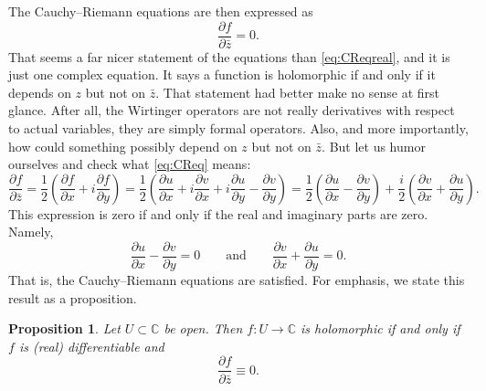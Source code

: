 \documentclass[12pt,openany]{book}
\newcommand{\C}{{\mathbb{C}}}
\theoremstyle{plain}
\newtheorem{prop}[thm]{Proposition}
\theoremstyle{remark}
\theoremstyle{definition}
\theoremstyle{exercise}
\theoremstyle{example}
\begin{document}
The Cauchy--Riemann equations are then expressed as
\begin{equation} \label{eq:CReq}
\frac{\partial f}{\partial \bar{z}} = 0 .
\end{equation}
That seems a far nicer statement of the equations than \eqref{eq:CReqreal},
and it is just one complex equation.  
It says
a function is holomorphic if and only if it depends on $z$ but not on
$\bar{z}$.  That statement had better make no sense at first glance.
After all, the Wirtinger operators are not really derivatives with
respect to actual variables,
they are simply formal operators.
Also, and more importantly,
how could something possibly depend on $z$ but not on $\bar{z}$.
But let us humor ourselves and check what \eqref{eq:CReq} means:
\begin{equation*}
\frac{\partial f}{\partial \bar{z}} 
=
\frac{1}{2}
\left(
\frac{\partial f}{\partial x} + i
\frac{\partial f}{\partial y}
\right)
=
\frac{1}{2}
\left(
\frac{\partial u}{\partial x} 
+ i \frac{\partial v}{\partial x} 
+ i \frac{\partial u}{\partial y}
- \frac{\partial v}{\partial y}
\right) 
=
\frac{1}{2}
\left(
\frac{\partial u}{\partial x} 
- \frac{\partial v}{\partial y}
\right)
+
\frac{i}{2}
\left(
\frac{\partial v}{\partial x} 
+ \frac{\partial u}{\partial y}
\right) .
\end{equation*}
This expression is zero if and only if the real and imaginary
parts are zero.  Namely,
\begin{equation*}
\frac{\partial u}{\partial x} 
- \frac{\partial v}{\partial y}
= 0
\qquad
\text{and}
\qquad
\frac{\partial v}{\partial x} 
+ \frac{\partial u}{\partial y} = 0
.
\end{equation*}
That is, the Cauchy--Riemann equations are satisfied.  For emphasis,
we state this result as a proposition.

\begin{prop}
\label{prop:WirtCR}
Let $U \subset \C$ be open.  Then $f \colon U \to \C$ is
holomorphic if and only if
$f$ is (real) differentiable and
\begin{equation*}
\frac{\partial f}{\partial \bar{z}} \equiv 0 .
\end{equation*}
\end{prop}
\end{document}
